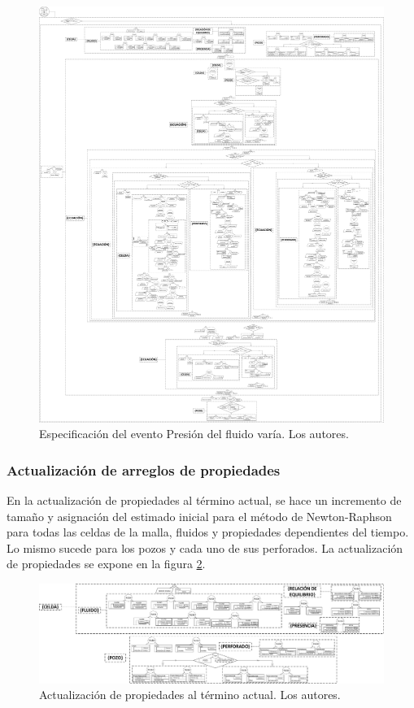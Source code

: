 \begin{figure}[h]
	\centering%
	\includegraphics[width=0.9\linewidth]{Fig/PresionVaria.pdf}%
	\caption[Especificación del evento Presión del fluido varía.]{Especificación del evento Presión del fluido varía. Los autores.} \label{fig:FluidPressureVaries}
\end{figure}

\subsubsection{Actualización de arreglos de propiedades}\label{subsec:PS_DefVars}
En la actualización de propiedades al término actual, se hace un incremento de tamaño y asignación del estimado inicial para el método de Newton-Raphson para todas las celdas de la malla, fluidos y propiedades dependientes del tiempo. Lo mismo sucede para los pozos y cada uno de sus perforados. La actualización de propiedades se expone en la figura \ref{fig:UpdateProperties}. 

\begin{figure}[h]
	\centering%
	\includegraphics[width=\linewidth]{Fig/ActualizacionDeVariables.pdf}%
	\caption[Actualización de propiedades al término actual.]{Actualización de propiedades al término actual. Los autores.} \label{fig:UpdateProperties}
\end{figure}


